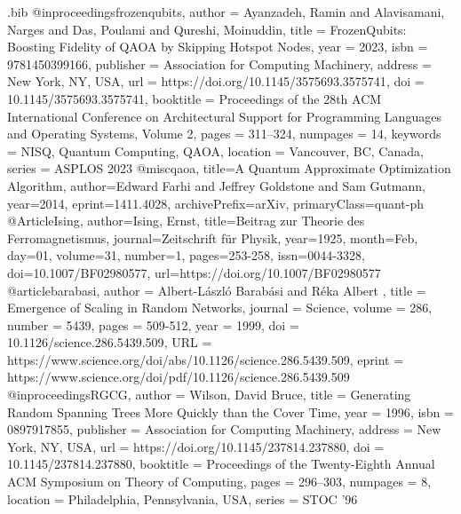 \usepackage{datetime}

\usepackage{amssymb}
\usepackage{amsmath}
\usepackage{subfig}
\usepackage{pgfplots}
\usetikzlibrary{positioning,calc,arrows}
\usepackage{float}
\usepackage{stackengine}
\usepackage{xcolor}

\begin{filecontents}{\jobname.bib}
@inproceedings{frozenqubits,
author = {Ayanzadeh, Ramin and Alavisamani, Narges and Das, Poulami and Qureshi, Moinuddin},
title = {FrozenQubits: Boosting Fidelity of QAOA by Skipping Hotspot Nodes},
year = {2023},
isbn = {9781450399166},
publisher = {Association for Computing Machinery},
address = {New York, NY, USA},
url = {https://doi.org/10.1145/3575693.3575741},
doi = {10.1145/3575693.3575741},
booktitle = {Proceedings of the 28th ACM International Conference on Architectural Support for Programming Languages and Operating Systems, Volume 2},
pages = {311–324},
numpages = {14},
keywords = {NISQ, Quantum Computing, QAOA},
location = {Vancouver, BC, Canada},
series = {ASPLOS 2023}
}
@misc{qaoa,
      title={A Quantum Approximate Optimization Algorithm}, 
      author={Edward Farhi and Jeffrey Goldstone and Sam Gutmann},
      year={2014},
      eprint={1411.4028},
      archivePrefix={arXiv},
      primaryClass={quant-ph}
}
@Article{Ising,
author={Ising, Ernst},
title={Beitrag zur Theorie des Ferromagnetismus},
journal={Zeitschrift f{\"u}r Physik},
year={1925},
month={Feb},
day={01},
volume={31},
number={1},
pages={253-258},
issn={0044-3328},
doi={10.1007/BF02980577},
url={https://doi.org/10.1007/BF02980577}
}
@article{barabasi,
author = {Albert-László Barabási  and Réka Albert },
title = {Emergence of Scaling in Random Networks},
journal = {Science},
volume = {286},
number = {5439},
pages = {509-512},
year = {1999},
doi = {10.1126/science.286.5439.509},
URL = {https://www.science.org/doi/abs/10.1126/science.286.5439.509},
eprint = {https://www.science.org/doi/pdf/10.1126/science.286.5439.509}
}
@inproceedings{RGCG,
author = {Wilson, David Bruce},
title = {Generating Random Spanning Trees More Quickly than the Cover Time},
year = {1996},
isbn = {0897917855},
publisher = {Association for Computing Machinery},
address = {New York, NY, USA},
url = {https://doi.org/10.1145/237814.237880},
doi = {10.1145/237814.237880},
booktitle = {Proceedings of the Twenty-Eighth Annual ACM Symposium on Theory of Computing},
pages = {296–303},
numpages = {8},
location = {Philadelphia, Pennsylvania, USA},
series = {STOC '96}
}
\end{filecontents}

